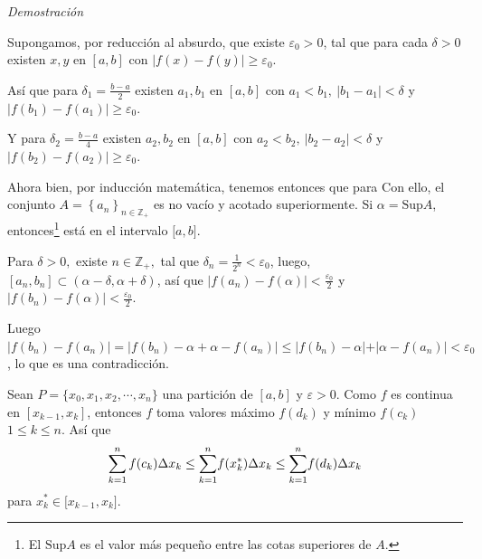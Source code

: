 \emph{Demostración}
\begin{parrafonumerado}
\item Supongamos, por reducción al absurdo, que existe $\varepsilon _{0}>0$,
tal que para cada $\delta >0$ existen $x,y$ en $[a,b]$ con $\left\vert
f\left( x\right) -f\left( y\right) \right\vert \geq \varepsilon _{0}.$

Así que para $\delta _{1}=\frac{b-a}{2}$ existen $a_{1},b_{1}$ en $[a,b]$ con $%
a_{1}<b_{1},\ \left\vert b_{1}-a_{1}\right\vert <\delta $ y
$\left\vert f\left( b_{1}\right) -f\left( a_{1}\right) \right\vert
\geq \varepsilon _{0}$.

Y para $\delta _{2}=\frac{b-a}{4}$ existen $a_{2},b_{2}$ en $[a,b]$ con $%
a_{2}<b_{2},\ \left\vert b_{2}-a_{2}\right\vert <\delta $ y
$\left\vert f\left( b_{2}\right) -f\left( a_{2}\right) \right\vert
\geq \varepsilon _{0}$.

Ahora bien, por inducción matemática, tenemos entonces que para  Con ello, el conjunto $A=\left\{ a_{n}\right\} _{n\in \mathbb{Z}_{+}}$ es no vacío y acotado superiormente. Si $\alpha=\text{Sup}A$, entonces\footnote{El
$\text{Sup}A$ es el valor más pequeño entre las cotas superiores
de $A$.} está en el intervalo $\lbrack a,b]$.


Para $\delta >0,$ existe $n\in \mathbb{Z}_{+},$ tal que $\delta _{n}=\frac{1%
}{2^{n}}<\varepsilon _{0}$, luego, $\left[ a_{n},b_{n}\right] \subset \left(
\alpha -\delta ,\alpha +\delta \right)$, así que $\left\vert f\left(
a_{n}\right) -f\left( \alpha \right) \right\vert <\frac{\varepsilon _{0}}{2}$ y $\left\vert f\left( b_{n}\right) -f\left( \alpha \right) \right\vert < \frac{\varepsilon _{0}}{2}$.

Luego $\vert f( b_{n}) -f( a_{n}) \vert =\vert f( b_{n}) -\alpha +\alpha -f( a_{n}) \vert \leq \vert f( b_{n}) -\alpha \vert +\vert \alpha -f( a_{n}) \vert <\varepsilon _{0}$, lo que es una contradicción.

\item Sean $P=\{x_{0},x_{1},x_{2},\cdots ,x_{n}\}$ una partición de $[a,b]$ y $\varepsilon >0$. Como $f$ es continua en $[x_{k-1},x_{k}]$, entonces $f$ toma valores máximo $f(d_{k})$ y mínimo $f(c_{k})$ \ $1\leq k\leq n$. Así que
\[
\sum_{k=1}^{n}f(c_{k})\Delta x_{k}\leq \overset{n}{%
\underset{k=1}{\sum }}f(x_{k}^{\ast })\Delta x_{k}\leq \overset{n}{%
\underset{k=1}{\sum }}f(d_{k})\Delta x_{k}
\]
para $x_{k}^{\ast }\in \lbrack x_{k-1},x_{k}]$.


\end{parrafonumerado}
